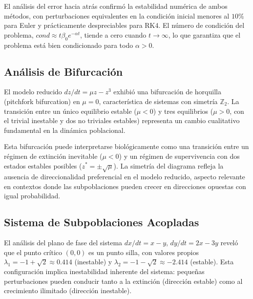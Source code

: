 \documentclass[a4paper,10pt,twocolumn]{article}
\begin{document}
El análisis del error hacia atrás confirmó la estabilidad numérica de ambos métodos, con perturbaciones equivalentes en la condición inicial menores al $10\%$ para Euler y prácticamente despreciables para RK4. El número de condición del problema, $cond \approx t\beta_0 e^{-\alpha t}$, tiende a cero cuando $t \to \infty$, lo que garantiza que el problema está bien condicionado para todo $\alpha > 0$.

\subsection{Análisis de Bifurcación}\label{subsec:resultados-bifurcacion}

El modelo reducido $dz/dt = \mu z - z^3$ exhibió una bifurcación de horquilla (pitchfork bifurcation) en $\mu = 0$, característica de sistemas con simetría $\mathbb{Z}_2$. La transición entre un único equilibrio estable ($\mu < 0$) y tres equilibrios ($\mu > 0$, con el trivial inestable y dos no triviales estables) representa un cambio cualitativo fundamental en la dinámica poblacional.

Esta bifurcación puede interpretarse biológicamente como una transición entre un régimen de extinción inevitable ($\mu < 0$) y un régimen de supervivencia con dos estados estables posibles ($z^* = \pm\sqrt{\mu}$). La simetría del diagrama refleja la ausencia de direccionalidad preferencial en el modelo reducido, aspecto relevante en contextos donde las subpoblaciones pueden crecer en direcciones opuestas con igual probabilidad.

\subsection{Sistema de Subpoblaciones Acopladas}\label{subsec:resultados-plano-fase}

El análisis del plano de fase del sistema $dx/dt = x - y$, $dy/dt = 2x - 3y$ reveló que el punto crítico $(0,0)$ es un punto silla, con valores propios $\lambda_1 = -1 + \sqrt{2} \approx 0.414$ (inestable) y $\lambda_2 = -1 - \sqrt{2} \approx -2.414$ (estable). Esta configuración implica inestabilidad inherente del sistema: pequeñas perturbaciones pueden conducir tanto a la extinción (dirección estable) como al crecimiento ilimitado (dirección inestable).
\end{document}
